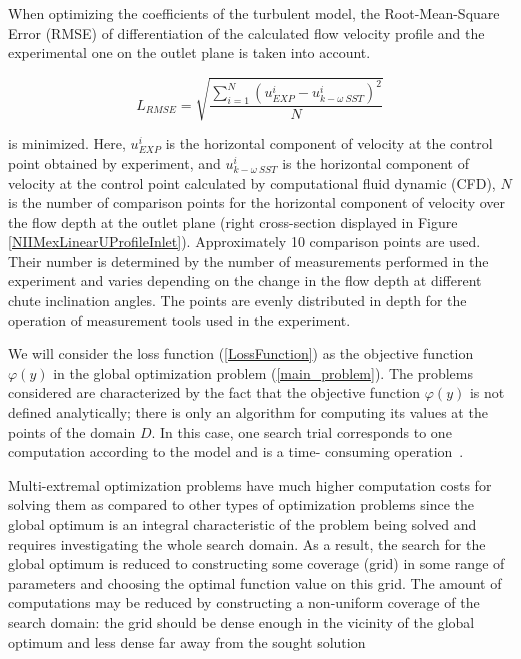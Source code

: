 \documentclass[mathematics,article,accept,pdftex,moreauthors]{Definitions/mdpi}
\begin{document}
When optimizing the coefficients of the turbulent model, the Root-Mean-Square Error (RMSE) of differentiation of the calculated flow velocity profile and the experimental one on the outlet plane is taken into account. 
\begin{linenomath}
\begin{equation}
	\label{LossFunction}
	 {L_{RMSE}} = \sqrt{\frac{\sum\limits_{i=1}^{N} \left( u_{EXP}^i - u_{k-\omega\ SST}^i \right)^2}{N}}
\end{equation}
\end{linenomath}
is minimized. 
Here, $u_{EXP}^i$ is the horizontal component of velocity at the control point obtained by experiment, and $u_{k-\omega\ SST}^i$  is the horizontal component of velocity at the control point calculated by computational fluid dynamic (CFD), $N$ is the number of comparison points for the horizontal component of velocity over the flow depth at the outlet plane (right cross-section displayed in Figure \ref{NIIMexLinearUProfileInlet}). Approximately 10 comparison points are used. Their number is determined by the number of measurements performed in the experiment and varies depending on the change in the flow depth at different chute inclination angles. The points are evenly distributed in depth for the operation of measurement tools used in the experiment.


We will consider the loss function (\ref{LossFunction}) as the objective function $\varphi(y)$ in the global optimization problem (\ref{main_problem}). 
The problems considered are characterized by the fact that the objective function $\varphi(y)$ is not defined analytically; there is only an algorithm for computing its values at the points of the domain $D$. In this case, one search trial corresponds to one computation according to the model and is a time- consuming operation~\cite{Kalyulin2017,Paulavicius2020}.

Multi-extremal optimization problems have much higher computation costs for solving them as compared to other types of optimization problems since the global optimum is an integral characteristic of the problem being solved and requires investigating the whole search domain. As a result, the search for the global optimum is reduced to constructing some coverage (grid) in some range of parameters and choosing the optimal function value on this grid. The amount of computations may be reduced by constructing a non-uniform coverage of the search domain: the grid should be dense enough in the vicinity of the global optimum and less dense far away from the sought solution
\end{document}
